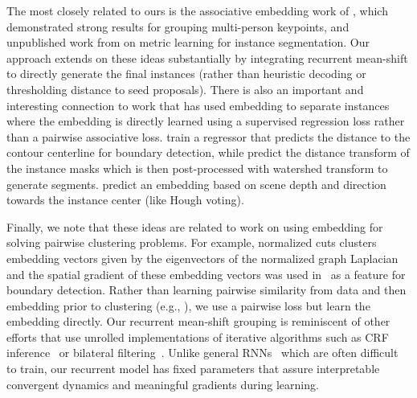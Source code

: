 \documentclass[10pt,twocolumn,letterpaper]{article}
\begin{document}
The most closely related to ours is the associative embedding work of
\cite{newell2016associative}, which demonstrated strong results for grouping
multi-person keypoints, and unpublished work from \cite{fathi2017semantic} on
metric learning for instance segmentation.  Our approach extends on these ideas
substantially by integrating recurrent mean-shift to directly generate the
final instances (rather than heuristic decoding or thresholding distance to
seed proposals). There is also an important and interesting connection to work
that has used embedding to separate instances where the embedding is directly
learned using a supervised regression loss rather than a pairwise associative
loss.  \cite{sironi2014multiscale} train a regressor that predicts the distance
to the contour centerline for boundary detection, while \cite{bai2016deep}
predict the distance transform of the instance masks which is then
post-processed with watershed transform to generate segments.
\cite{uhrig2016pixel} predict an embedding based on scene depth and direction
towards the instance center (like Hough voting).

Finally, we note that these ideas are related to work on using embedding for
solving pairwise clustering problems. For example, normalized cuts clusters
embedding vectors given by the eigenvectors of the normalized graph
Laplacian~\cite{shi2000normalized} and the spatial gradient of these embedding
vectors was used in~\cite{arbelaez2011contour} as a feature for boundary
detection. Rather than learning pairwise similarity from data and then
embedding prior to clustering (e.g., \cite{maire2016affinity}), we use a
pairwise loss but learn the embedding directly. Our recurrent mean-shift
grouping is reminiscent of other efforts that use unrolled implementations of
iterative algorithms such as CRF inference~\cite{zheng2015conditional} or
bilateral filtering~\cite{jampani2016learning, gadde2015superpixel}. Unlike
general RNNs~\cite{bengio1994learning, pascanu2013difficulty} which are often
difficult to train, our recurrent model has fixed parameters that assure
interpretable convergent dynamics and meaningful gradients during learning.
\end{document}
